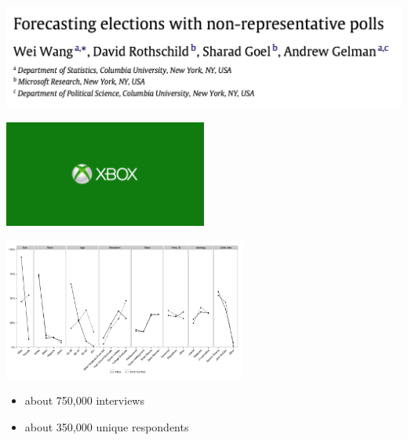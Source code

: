 \documentclass[aspectratio=169]{beamer}
\begin{document}
\begin{frame}

\begin{center}
\includegraphics[width=\textwidth]{figures/wang_forecasting_2015_title}
\end{center}

\begin{center}
\includegraphics[width=0.5\textwidth]{figures/xboxlogo}
\end{center}

\end{frame}
\begin{frame}

\begin{center}
\includegraphics[width=0.6\textwidth]{figures/wang_forecasting_2015_fig1}
\end{center}

\begin{itemize}
\item about 750,000 interviews
\item about 350,000 unique respondents
\end{itemize}

\end{frame}
\end{document}
